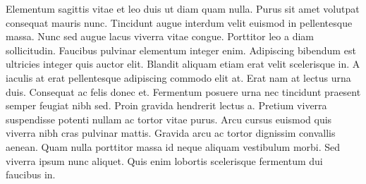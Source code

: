 Elementum sagittis vitae et leo duis ut diam quam nulla. Purus sit amet volutpat consequat mauris nunc. Tincidunt augue interdum 
velit euismod in pellentesque massa. Nunc sed augue lacus viverra vitae congue. Porttitor leo a diam sollicitudin. Faucibus pulvinar
 elementum integer enim. Adipiscing bibendum est ultricies integer quis auctor elit. Blandit aliquam etiam erat velit scelerisque in. 
 A iaculis at erat pellentesque adipiscing commodo elit at. Erat nam at lectus urna duis. Consequat ac felis donec et. Fermentum posuere 
 urna nec tincidunt praesent semper feugiat nibh sed. Proin gravida hendrerit lectus a. Pretium viverra suspendisse potenti nullam ac 
 tortor vitae purus. Arcu cursus euismod quis viverra nibh cras pulvinar mattis. Gravida arcu ac tortor dignissim convallis aenean. 
 Quam nulla porttitor massa id neque aliquam vestibulum morbi. Sed viverra ipsum nunc aliquet. Quis enim lobortis scelerisque fermentum 
 dui faucibus in.